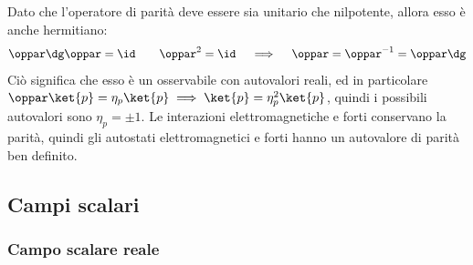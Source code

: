 Dato che l'operatore di parità deve essere sia unitario che nilpotente, allora esso è anche hermitiano:
\begin{equation*}
  \oppar\dg \oppar = \id
  \qquad
  \oppar^2 = \id
  \quad \implies \quad
  \oppar = \oppar^{-1} = \oppar\dg
\end{equation*}
Ciò significa che esso è un osservabile con autovalori reali, ed in particolare $ \oppar \ket{p} = \eta_p \ket{p} \implies \ket{p} = \eta_p^2 \ket{p} $, quindi i possibili autovalori sono $ \eta_p = \pm 1 $. Le interazioni elettromagnetiche e forti conservano la parità, quindi gli autostati elettromagnetici e forti hanno un autovalore di parità ben definito.

\subsection{Campi scalari}

\subsubsection{Campo scalare reale}

